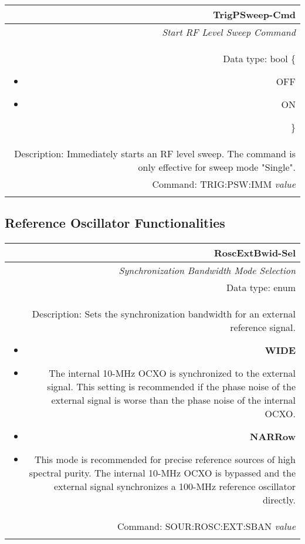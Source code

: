 \documentclass[openany]{article}
\begin{document}
		\begin{tabular}{N}
			\hline
			\bfseries TrigPSweep-Cmd \\ \hline
			\emph{Start RF Level Sweep Command} \\
			Data type: bool \{\begin{itemize}[noitemsep]
				\small
				\item[] OFF
				\item[] ON
			\end{itemize}\} \\
			Description: Immediately starts an RF level sweep. The command is only effective for sweep mode "Single". \\
			Command: TRIG:PSW:IMM \emph{value} \\
			\\

		\end{tabular}


	\subsection{Reference Oscillator Functionalities}\label{pvgroup:function} %

		\paragraph{} %


		\begin{tabular}{N}
			\hline
			\bfseries RoscExtBwid-Sel \\ \hline
			\emph{Synchronization Bandwidth Mode Selection} \\
			Data type: enum \\   
			Description: Sets the synchronization bandwidth for an external reference signal.\begin{itemize}[noitemsep]
				\small
				\item[] \textbf{WIDE}
				\item[] The internal 10-MHz OCXO is synchronized to the external signal. This setting is recommended if the phase noise of the external signal is worse than the phase noise of the internal OCXO.
                                \item[] \textbf{NARRow}
				\item[] This mode is recommended for precise reference sources of high spectral purity. The internal 10-MHz OCXO is bypassed and the external signal synchronizes a 100-MHz reference oscillator directly.
			\end{itemize} \\
			Command: SOUR:ROSC:EXT:SBAN \emph{value} \\
			\\

		\end{tabular}
\end{document}
